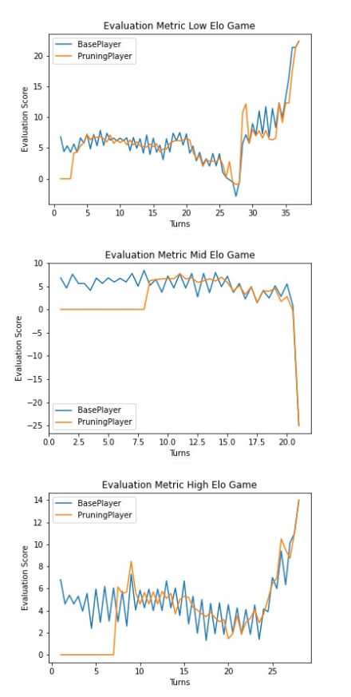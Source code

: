 \documentclass[letterpaper]{article}
\begin{document}
\begin{figure}
    \centering

    \includegraphics[scale= 0.38]{low_game_eval.jpg}
    \includegraphics[scale= 0.38]{mid_game_eval.jpg}
    \includegraphics[scale= 0.38]{high_game_eval.jpg}


\end{figure}
\end{document}
